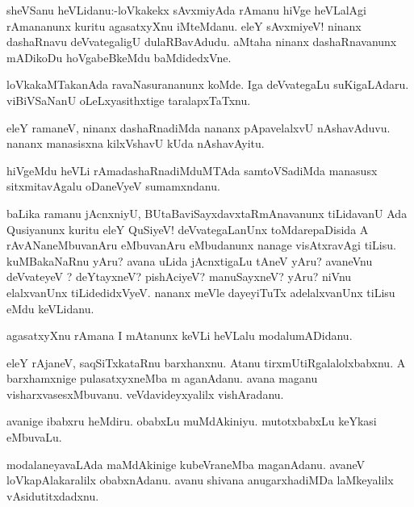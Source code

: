 \documentclass{article}
\begin{document}
\begin{mn}%
sheVSanu heVLidanu:-loVkakekx sAvxmiyAda rAmanu hiVge heVLalAgi rAmananunx kuritu 
agasatxyXnu iMteMdanu. eleY sAvxmiyeV! ninanx dashaRnavu deVvategaligU dulaRBavAdudu. 
aMtaha ninanx dashaRnavanunx mADikoDu hoVgabeBkeMdu baMdidedxVne.
\end{mn}

\begin{mn}%
loVkakaMTakanAda ravaNasurananunx koMde. Iga deVvategaLu suKigaLAdaru. viBiVSaNanU 
oLeLxyasithxtige taralapxTaTxnu.
\end{mn}

\begin{mn}%
eleY ramaneV, ninanx dashaRnadiMda nananx pApavelalxvU nAshavAduvu. nananx manasisxna 
kilxVshavU kUda nAshavAyitu.
\end{mn}

\begin{mn}%
hiVgeMdu heVLi rAmadashaRnadiMduMTAda samtoVSadiMda manasusx sitxmitavAgalu oDaneVyeV 
sumamxndanu.
\end{mn}

\begin{mn}%
baLika ramanu jAcnxniyU, BUtaBaviSayxdavxtaRmAnavanunx tiLidavanU Ada Qusiyanunx kuritu eleY 
QuSiyeV! deVvategaLanUnx toMdarepaDisida A rAvANaneMbuvanAru eMbuvanAru eMbudanunx nanage 
visAtxravAgi tiLisu. kuMBakaNaRnu yAru? avana uLida jAcnxtigaLu tAneV yAru? avaneVnu 
deVvateyeV ? deYtayxneV? pishAciyeV? manuSayxneV? yAru? niVnu elalxvanUnx tiLidedidxVyeV. 
nananx meVle dayeyiTuTx adelalxvanUnx tiLisu eMdu keVLidanu.
\end{mn}

\begin{mn}%
agasatxyXnu rAmana I mAtanunx keVLi heVLalu modalumADidanu.
\end{mn}

\begin{mn}%
eleY rAjaneV, saqSiTxkataRnu barxhanxnu. Atanu tirxmUtiRgalalolxbabxnu. A barxhamxnige 
pulasatxyxneMba m aganAdanu. avana maganu visharxvasesxMbuvanu. veVdavideyxyalilx 
vishAradanu.
\end{mn}

\begin{mn}%
avanige ibabxru heMdiru. obabxLu muMdAkiniyu. mutotxbabxLu keYkasi eMbuvaLu.
\end{mn}

\begin{mn}%
modalaneyavaLAda maMdAkinige kubeVraneMba maganAdanu. avaneV loVkapAlakaralilx 
obabxnAdanu. avanu shivana anugarxhadiMDa laMkeyalilx vAsidutitxdadxnu.
\end{mn}
\end{document}
